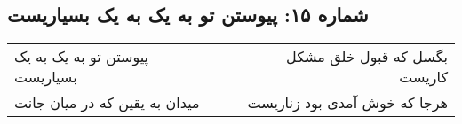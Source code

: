 \begin{center}
\section*{شماره ۱۵: پیوستن تو به یک به یک بسیاریست}
\label{sec:015}
\begin{longtable}{l p{0.5cm} r}
پیوستن تو به یک به یک بسیاریست
&&
بگسل که قبول خلق مشکل کاریست
\\
میدان به یقین که در میان جانت
&&
هرجا که خوش آمدی بود زناریست
\\
\end{longtable}
\end{center}
